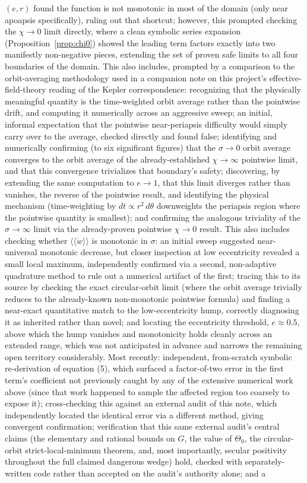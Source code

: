 \documentclass[12pt]{amsart}
\theoremstyle{plain}
\theoremstyle{remark}
\begin{document}
$(e,r)$ found the function is not monotonic in most of the domain (only near apoapsis specifically), ruling out that shortcut; however, this prompted checking the $\chi\to0$ limit directly, where a clean symbolic series expansion (Proposition~\ref{prop:chi0}) showed the leading term factors exactly into two manifestly non-negative pieces, extending the set of proven safe limits to all four boundaries of the domain. This also includes, prompted by a comparison to the orbit-averaging methodology used in a companion note on this project's effective-field-theory reading of the Kepler correspondence: recognizing that the physically meaningful quantity is the time-weighted orbit average rather than the pointwise drift, and computing it numerically across an aggressive sweep; an initial, informal expectation that the pointwise near-periapsis difficulty would simply carry over to the average, checked directly and found false; identifying and numerically confirming (to six significant figures) that the $\sigma\to0$ orbit average converges to the orbit average of the already-established $\chi\to\infty$ pointwise limit, and that this convergence trivializes that boundary's safety; discovering, by extending the same computation to $e\to1$, that this limit diverges rather than vanishes, the reverse of the pointwise result, and identifying the physical mechanism (time-weighting by $dt\propto r^2\,d\theta$ downweights the periapsis region where the pointwise quantity is smallest); and confirming the analogous triviality of the $\sigma\to\infty$ limit via the already-proven pointwise $\chi\to0$ result. This also includes checking whether $\langle\langle\dot w\rangle\rangle$ is monotonic in $\sigma$: an initial sweep suggested near-universal monotonic decrease, but closer inspection at low eccentricity revealed a small local maximum, independently confirmed via a second, non-adaptive quadrature method to rule out a numerical artifact of the first; tracing this to its source by checking the exact circular-orbit limit (where the orbit average trivially reduces to the already-known non-monotonic pointwise formula) and finding a near-exact quantitative match to the low-eccentricity hump, correctly diagnosing it as inherited rather than novel; and locating the eccentricity threshold, $e\approx0.5$, above which the hump vanishes and monotonicity holds cleanly across an extended range, which was not anticipated in advance and narrows the remaining open territory considerably. Most recently: independent, from-scratch symbolic re-derivation of equation (5), which surfaced a factor-of-two error in the first term's coefficient not previously caught by any of the extensive numerical work above (since that work happened to sample the affected region too coarsely to expose it); cross-checking this against an external audit of this note, which independently located the identical error via a different method, giving convergent confirmation; verification that this same external audit's central claims (the elementary and rational bounds on $G$, the value of $\Theta_0$, the circular-orbit strict-local-minimum theorem, and, most importantly, secular positivity throughout the full claimed dangerous wedge) hold, checked with separately-written code rather than accepted on the audit's authority alone; and a 
\end{document}
